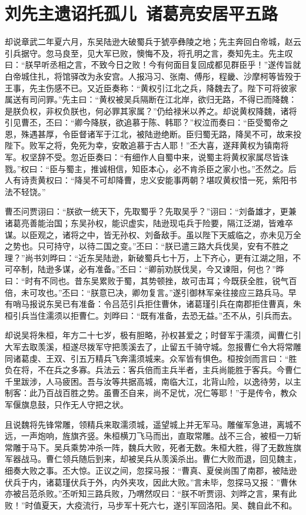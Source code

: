 \chapter{刘先主遗诏托孤儿~诸葛亮安居平五路}

却说章武二年夏六月，东吴陆逊大破蜀兵于猇亭彝陵之地；先主奔回白帝城，赵云引兵据守。忽马良至，见大军已败，懊悔不及，将孔明之言，奏知先主。先主叹曰：“朕早听丞相之言，不致今日之败！今有何面目复回成都见群臣乎！”遂传旨就白帝城住扎，将馆驿改为永安宫。人报冯习、张南、傅彤，程畿、沙摩柯等皆殁于王事，先主伤感不已。又近臣奏称：“黄权引江北之兵，降魏去了。陛下可将彼家属送有司问罪。”先主曰：“黄权被吴兵隔断在江北岸，欲归无路，不得已而降魏：是朕负权，非权负朕也，何必罪其家属？”仍给禄米以养之。却说黄权降魏，诸将引见曹丕，丕曰：“卿今降朕，欲追慕于陈、韩耶？”权泣而奏曰：“臣受蜀帝之恩，殊遇甚厚，令臣督诸军于江北，被陆逊绝断。臣归蜀无路，降吴不可，故来投陛下。败军之将，免死为幸，安敢追慕于古人耶！”丕大喜，遂拜黄权为镇南将军。权坚辞不受。忽近臣奏曰：“有细作人自蜀中来，说蜀主将黄权家属尽皆诛戮。”权曰：“臣与蜀主，推诚相信，知臣本心，必不肯杀臣之家小也。”丕然之。后人有诗责黄权曰：“降吴不可却降曹，忠义安能事两朝？堪叹黄权惜一死，紫阳书法不轻饶。”

曹丕问贾诩曰：“朕欲一统天下，先取蜀乎？先取吴乎？”诩曰：“刘备雄才，更兼诸葛亮善能治国；东吴孙权，能识虚实，陆逊现屯兵于险要，隔江泛湖，皆难卒谋。以臣观之，诸将之中，皆无孙权、刘备敌手。虽以陛下天威临之，亦未见万全之势也。只可持守，以待二国之变。”丕曰：“朕已遣三路大兵伐吴，安有不胜之理？”尚书刘晔曰：“近东吴陆逊，新破蜀兵七十万，上下齐心，更有江湖之阻，不可卒制，陆逊多谋，必有准备。”丕曰：“卿前劝朕伐吴，今又谏阻，何也？”晔曰：“时有不同也。昔东吴累败于蜀，其势顿挫，故可击耳；今既获全胜，锐气百倍，未可攻也。”丕曰：“朕意已决，卿勿复言。”遂引御林军亲往接应三路兵马。早有哨马报说东吴已有准备：令吕范引兵拒住曹休，诸葛瑾引兵在南郡拒住曹真，朱桓引兵当住濡须以拒曹仁。刘晔曰：“既有准备，去恐无益。”丕不从，引兵而去。

却说吴将朱桓，年方二十七岁，极有胆略，孙权甚爱之；时督军于濡须，闻曹仁引大军去取羡溪，桓遂尽拨军守把羡溪去了，止留五千骑守城。忽报曹仁令大将常雕同诸葛虔、王双、引五万精兵飞奔濡须城来。众军皆有惧色。桓按剑而言曰：“胜负在将，不在兵之多寡。兵法云：客兵倍而主兵半者，主兵尚能胜于客兵。今曹仁千里跋涉，人马疲困。吾与汝等共据高城，南临大江，北背山险，以逸待劳，以主制客：此乃百战百胜之势。虽曹丕自来，尚不足忧，况仁等耶！”于是传令，教众军偃旗息鼓，只作无人守把之状。

且说魏将先锋常雕，领精兵来取濡须城，遥望城上并无军马。雕催军急进，离城不远，一声炮响，旌旗齐竖。朱桓横刀飞马而出，直取常雕。战不三合，被桓一刀斩常雕于马下。吴兵乘势冲杀一阵，魏兵大败，死者无数。朱桓大胜，得了无数旌旗军器战马。曹仁领兵随后到来，却被吴兵从羡溪杀出。曹仁大败而退，回见魏主，细奏大败之事。丕大惊。正议之间，忽探马报：“曹真、夏侯尚围了南郡，被陆逊伏兵于内，诸葛瑾伏兵于外，内外夹攻，因此大败。”言未毕，忽探马又报：”曹休亦被吕范杀败。”丕听知三路兵败，乃喟然叹曰：“朕不听贾诩、刘晔之言，果有此败！”时值夏天，大疫流行，马步军十死六七，遂引军回洛阳。吴、魏自此不和。

